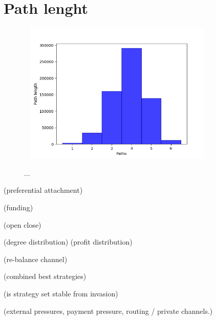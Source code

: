 \section{Path lenght}

\begin{figure}[!htb]
	\hspace*{-1cm}\ 
	\centering
	\includegraphics[width=9cm]{images/histogram_shortest_path.png}
	\caption{ ...
	}
	\label{fig:alloeeeec}
	\hspace*{2mm}
\end{figure}

(preferential attachment)

(funding)

(open close)

(degree distribution)
(profit distribution)

(re-balance channel)

(combined best strategies)

(is strategy set stable from invasion)

(external pressures, payment pressure, routing / private channels.)